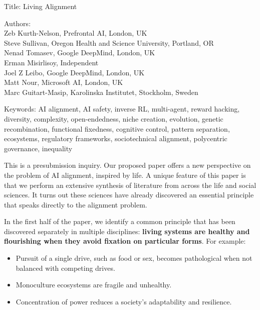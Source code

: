 \documentclass[fontsize=10.95pt]{scrartcl}
\begin{document}
\begingroup
\setlength{\leftskip}{1.5em}%
Title:
Living Alignment

Authors:\\
Zeb Kurth-Nelson, Prefrontal AI, London, UK\\
Steve Sullivan, Oregon Health and Science University, Portland, OR\\
Nenad Tomasev, Google DeepMind, London, UK\\
Erman Misirlisoy, Independent\\
Joel Z Leibo, Google DeepMind, London, UK\\
Matt Nour, Microsoft AI, London, UK\\
Marc Guitart-Masip, Karolinska Institutet, Stockholm, Sweden\par

Keywords: AI alignment, AI safety, inverse RL, multi-agent, reward hacking, diversity, complexity, open-endedness, niche creation, evolution, genetic recombination, functional fixedness, cognitive control, pattern separation, ecosystems, regulatory frameworks, sociotechnical alignment, polycentric governance, inequality

\endgroup

\vspace{1em}

This is a presubmission inquiry. Our proposed paper offers a new perspective on the problem of AI alignment, inspired by life. A unique feature of this paper is that we perform an extensive synthesis of literature from across the life and social sciences. It turns out these sciences have already discovered an essential principle that speaks directly to the alignment problem.

In the first half of the paper, we identify a common principle that has been discovered separately in multiple disciplines: \textbf{living systems are healthy and flourishing when they avoid fixation on particular forms}. For example:

\begin{itemize}[leftmargin=2em,itemsep=-.4em]
  \item Pursuit of a single drive, such as food or sex, becomes pathological when not balanced with competing drives.
  \item Monoculture ecosystems are fragile and unhealthy.
  \item Concentration of power reduces a society's adaptability and resilience.
\end{itemize}
\end{document}
